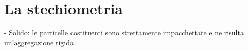 \section{La stechiometria}
- Solido: le particelle costituenti sono strettamente impacchettate e ne risulta un'aggregazione rigida
